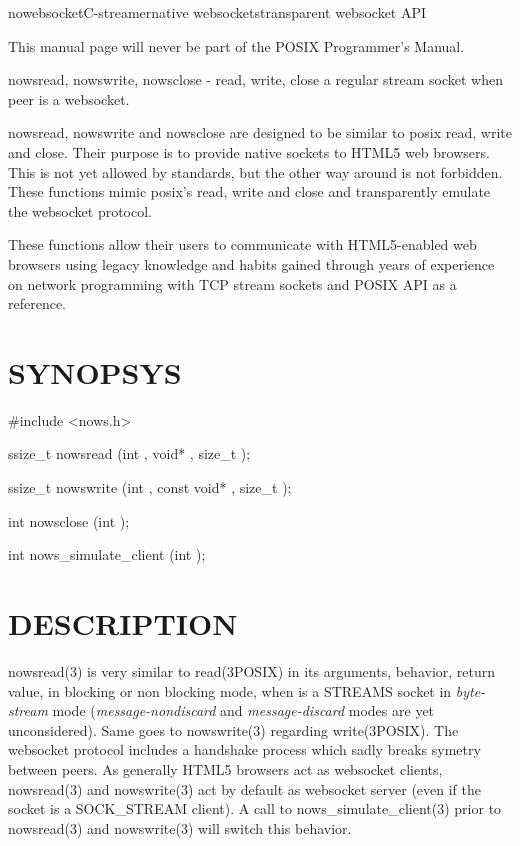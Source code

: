 \documentclass[a4paper,english]{article}
\begin{document}
\begin{Name}{3}{nowebsocket}{C-streamer}{native websockets}{transparent websocket API}

This manual page will never be part of the POSIX Programmer's Manual.

nowsread, nowswrite, nowsclose - read, write, close a regular stream socket when peer is a websocket.

nowsread, nowswrite and nowsclose are designed to be similar to posix read,
write and close.  Their purpose is to provide native sockets to HTML5 web
browsers.  This is not yet allowed by standards, but the other way around is
not forbidden.  These functions mimic posix's read, write and close and
transparently emulate the websocket protocol.

These functions allow their users to communicate with HTML5-enabled web
browsers using legacy knowledge and habits gained through years of
experience on network programming with TCP stream sockets and POSIX API as a
reference.

\section{SYNOPSYS}

#include <nows.h>

ssize_t nowsread  (int , void* , size_t );

ssize_t nowswrite (int , const void* , size_t );

int nowsclose (int );

int nows_simulate_client (int );

\section{DESCRIPTION}

nowsread(3) is very similar to read(3POSIX) in its arguments, behavior,
return value, in blocking or non blocking mode, when  is a STREAMS
socket in \emph{byte-stream} mode (\emph{message-nondiscard} and
\emph{message-discard} modes are yet unconsidered).  Same goes to
nowswrite(3) regarding write(3POSIX).  The websocket protocol includes a
handshake process which sadly breaks symetry between peers.  As generally
HTML5 browsers act as websocket clients, nowsread(3) and nowswrite(3) act by
default as websocket server (even if the socket  is a SOCK_STREAM
client).  A call to nows_simulate_client(3) prior to nowsread(3) and
nowswrite(3) will switch this behavior.


\end{Name}
\end{document}
